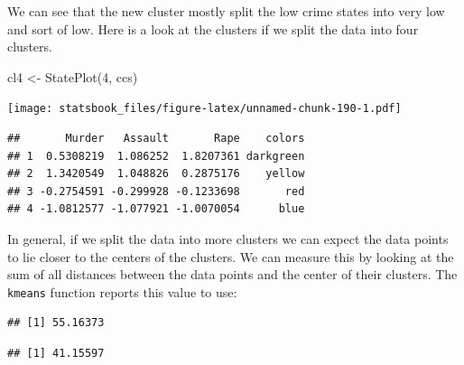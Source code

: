 \documentclass[
]{book}
\newenvironment{Shaded}{\begin{snugshade}}{\end{snugshade}}
\newcommand{\DecValTok}[1]{\textcolor[rgb]{0.00,0.00,0.81}{#1}}
\newcommand{\FunctionTok}[1]{\textcolor[rgb]{0.00,0.00,0.00}{#1}}
\newcommand{\NormalTok}[1]{#1}
\newcommand{\OtherTok}[1]{\textcolor[rgb]{0.56,0.35,0.01}{#1}}
\newcommand{\SpecialCharTok}[1]{\textcolor[rgb]{0.00,0.00,0.00}{#1}}
\theoremstyle{definition}
\theoremstyle{definition}
\theoremstyle{definition}
\theoremstyle{definition}
\theoremstyle{remark}
\begin{document}
We can see that the new cluster mostly split the low crime states into very low and sort of low. Here is a look at the clusters if we split the data into four clusters.

\begin{Shaded}
\begin{Highlighting}[]
\NormalTok{cl4 }\OtherTok{\textless{}{-}} \FunctionTok{StatePlot}\NormalTok{(}\DecValTok{4}\NormalTok{, ccs)}
\end{Highlighting}
\end{Shaded}

\texttt{[image: statsbook\_files/figure-latex/unnamed-chunk-190-1.pdf]}

\begin{verbatim}
##       Murder   Assault       Rape    colors
## 1  0.5308219  1.086252  1.8207361 darkgreen
## 2  1.3420549  1.048826  0.2875176    yellow
## 3 -0.2754591 -0.299928 -0.1233698       red
## 4 -1.0812577 -1.077921 -1.0070054      blue
\end{verbatim}

In general, if we split the data into more clusters we can expect the data points to lie closer to the centers of the clusters. We can measure this by looking at the sum of all distances between the data points and the center of their clusters. The \texttt{kmeans} function reports this value to use:

\begin{Shaded}
\end{Shaded}

\begin{verbatim}
## [1] 55.16373
\end{verbatim}

\begin{Shaded}
\end{Shaded}

\begin{verbatim}
## [1] 41.15597
\end{verbatim}

\begin{Shaded}
\end{Shaded}
\end{document}
